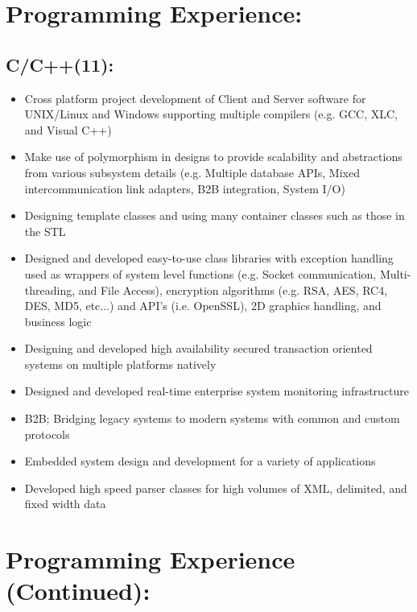 \documentclass[10pt]{report}
\begin{document}
\section*{Programming Experience:}

\subsection*{C/C++(11):}


\begin{itemize}
\item Cross platform project development of Client and Server software for UNIX/Linux and Windows supporting multiple compilers (e.g. GCC, XLC, and Visual C++)
\item Make use of polymorphism in designs to provide scalability and abstractions from various subsystem details (e.g. Multiple database APIs, Mixed intercommunication link adapters, B2B integration, System I/O)
\item Designing template classes and using many container classes such as those in the STL
\item Designed and developed easy-to-use class libraries with exception handling used as wrappers of system level functions (e.g. Socket communication, Multi-threading, and File Access), encryption algorithms (e.g. RSA, AES, RC4, DES, MD5, etc...) and API’s (i.e. OpenSSL), 2D graphics handling, and business logic 
\item Designing and developed high availability secured transaction oriented systems on multiple platforms natively
\item Designed and developed real-time enterprise system monitoring infrastructure
\item B2B; Bridging legacy systems to modern systems with common and custom protocols
\item Embedded system design and development for a variety of applications
\item Developed high speed parser classes for high volumes of XML, delimited, and fixed width data
\end{itemize}


\section*{Programming Experience (Continued):}
\end{document}
